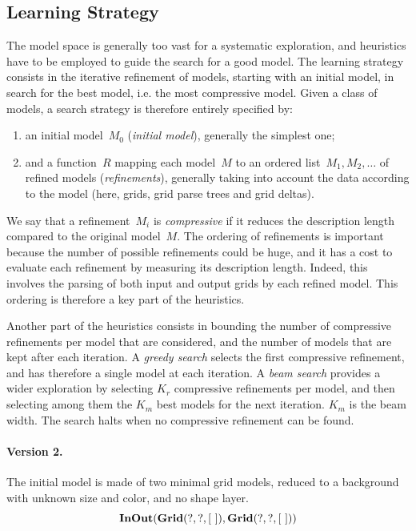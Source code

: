 \documentclass[a4paper]{llncs}
\begin{document}
\subsection{Learning Strategy}

The model space is generally too vast for a systematic exploration,
and heuristics have to be employed to guide the search for a good
model.
%
The learning strategy consists in the iterative refinement of models,
starting with an initial model, in search for the best model, i.e. the
most compressive model. Given a class of models, a search strategy is
therefore entirely specified by:
\begin{enumerate}
\item an initial model~$M_0$ ({\em initial model}), generally the
  simplest one;
\item and a function~$R$ mapping each model~$M$ to an ordered
  list~$M_1, M_2, \ldots$ of refined models ({\em refinements}),
  generally taking into account the data according to the model (here,
  grids, grid parse trees and grid deltas).
\end{enumerate}
We say that a refinement~$M_i$ is {\em compressive} if it reduces the
description length compared to the original model~$M$. The ordering of
refinements is important because the number of possible refinements
could be huge, and it has a cost to evaluate each refinement by
measuring its description length. Indeed, this involves the parsing of
both input and output grids by each refined model.  This ordering is
therefore a key part of the heuristics.

Another part of the heuristics consists in bounding the number of
compressive refinements per model that are considered, and the number
of models that are kept after each iteration. A {\em greedy search}
selects the first compressive refinement, and has therefore a single
model at each iteration. A {\em beam search} provides a wider
exploration by selecting $K_r$ compressive refinements per model, and
then selecting among them the $K_m$ best models for the next
iteration. $K_m$ is the beam width. The search halts when no
compressive refinement can be found.

\paragraph{Version 2.} The initial model is made of two minimal grid
models, reduced to a background with unknown size and color, and no
shape layer.
\[ {\bf InOut}({\bf Grid}(?,?,[\ ]), {\bf Grid}(?,?,[\ ])) \]
\end{document}
